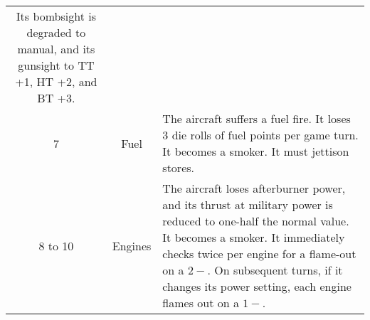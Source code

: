 {\begin{twocolumntable}
{\begin{tabularx}{\linewidth}{ccX}
Its bombsight is degraded to manual, and its gunsight to TT +1, HT +2, and BT +3.
\\
7&Fuel&
The aircraft suffers a fuel fire.
It loses 3 die rolls of fuel points per game turn. 
It becomes a smoker.
It must jettison stores.
\\
8 to 10&Engines&
The aircraft loses afterburner power, and its thrust at military power is reduced to one-half the normal value.
It becomes a smoker.
It immediately checks twice per engine for a flame-out on a $2-$. On subsequent turns, if it changes its power setting, each engine flames out on a $1-$.
\\
\bottomrule
\end{tabularx}

}

\end{twocolumntable}

}
